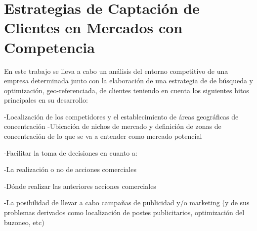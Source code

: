 \chapter{Estrategias de Captación de Clientes en Mercados con Competencia}




En este trabajo se lleva a cabo un análisis del entorno competitivo de una empresa determinada junto con la elaboración de una estrategia de de búsqueda y optimización, geo-referenciada, de clientes teniendo en cuenta los siguientes hitos principales en su desarrollo:

-Localización de los competidores y el establecimiento de áreas geográficas de concentración
-Ubicación de nichos de mercado y definición de zonas de concentración de lo que se va a entender como mercado potencial

	    -Facilitar la toma de decisiones en cuanto a: 

	    -La realización o no de acciones comerciales

	 	    -Dónde realizar las anteriores acciones comerciales

    -La posibilidad de llevar a cabo campañas de publicidad y/o marketing (y de sus problemas derivados como localización de postes publicitarios, optimización del buzoneo, etc)

